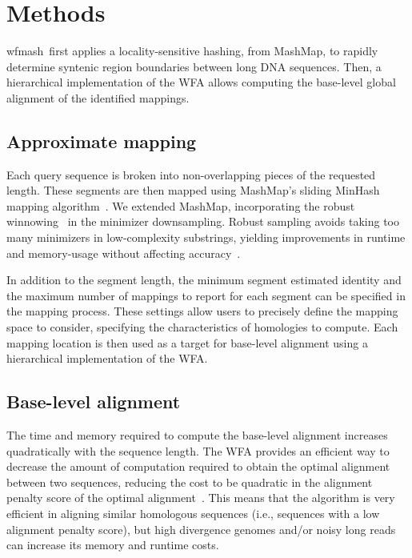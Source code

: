 \documentclass{bioinfo}
\newcommand{\wfmash}{wfmash}
\begin{document}


    \section{Methods}

    \wfmash\ first applies a locality-sensitive hashing, from MashMap, to rapidly determine syntenic region
    boundaries between long DNA sequences. Then, a hierarchical implementation of the WFA allows computing the
    base-level global alignment of the identified mappings.

    \subsection{Approximate mapping}

    Each query sequence is broken into non-overlapping pieces of the requested length. These segments are then
    mapped using MashMap's sliding MinHash mapping algorithm~\citep{30423094}. We extended MashMap, incorporating
    the robust winnowing~\citep{Schleimer S. et al. (2003)} in the minimizer downsampling.
    Robust sampling avoids taking too many minimizers in low-complexity substrings, yielding improvements in
    runtime and memory-usage without affecting accuracy~\citep{32657365}.


    In addition to the segment length, the minimum segment estimated identity and the maximum number of
    mappings to report for each segment can be specified in the mapping process. These settings allow users
    to precisely define the mapping space to consider, specifying the characteristics of homologies to compute.
    Each mapping location is then used as a target for base-level alignment using a hierarchical implementation
    of the WFA.

    \subsection{Base-level alignment}

    The time and memory required to compute the base-level alignment increases quadratically with the sequence
    length. The WFA provides an efficient way to decrease the amount of computation required to obtain the
    optimal alignment between two sequences, reducing the cost to be quadratic in the alignment penalty score
    of the optimal alignment~\citep{32915952}. This means that the algorithm is very efficient in aligning
    similar homologous sequences (i.e., sequences with a low alignment penalty score), but high divergence
    genomes and/or noisy long reads can increase its memory and runtime costs.
\end{document}
